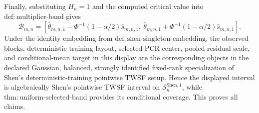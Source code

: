 Finally, substituting \(H_n=1\) and the computed critical value into \(\mathrm{def{:}multiplier\mbox{-}band}\) gives
\[
 \mathcal B_{m,n}
 =\left[
 \widehat\theta_{m,n,1}
 -\Phi^{-1}(1-\alpha/2)\widehat s_{m,n,1},
 \ \widehat\theta_{m,n,1}
 +\Phi^{-1}(1-\alpha/2)\widehat s_{m,n,1}
 \right].
\]
Under the identity embedding from \(\mathrm{def{:}shen\mbox{-}singleton\mbox{-}embedding}\), the observed blocks, deterministic training layout, selected-PCR center, pooled-residual scale, and conditional-mean target in this display are the corresponding objects in the declared Gaussian, balanced, strongly identified fixed-rank specialization of Shen's deterministic-training pointwise TWSF setup.  Hence the displayed interval is algebraically Shen's pointwise TWSF interval on \(\mathcal S_n^{\mathrm{Shen},1}\), while \(\mathrm{thm{:}uniform\mbox{-}selected\mbox{-}band}\) provides its conditional coverage.  This proves all claims.
